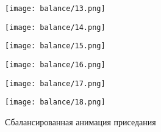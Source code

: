 \begin{figure}
\begin{minipage}{0.325\textwidth}
    \centering
    \texttt{[image: balance/13.png]}
  \end{minipage}
  \begin{minipage}{0.325\textwidth}
    \centering
    \texttt{[image: balance/14.png]}
  \end{minipage}
  \begin{minipage}{0.325\textwidth}
    \centering
    \texttt{[image: balance/15.png]}
  \end{minipage}
  \vfill
  \hfill
  \begin{minipage}{0.325\textwidth}
    \centering
    \texttt{[image: balance/16.png]}
  \end{minipage}
  \begin{minipage}{0.325\textwidth}
    \centering
    \texttt{[image: balance/17.png]}
  \end{minipage}
  \begin{minipage}{0.325\textwidth}
    \centering
    \texttt{[image: balance/18.png]}
  \end{minipage}
  \caption{Сбалансированная анимация приседания}
\end{figure}
